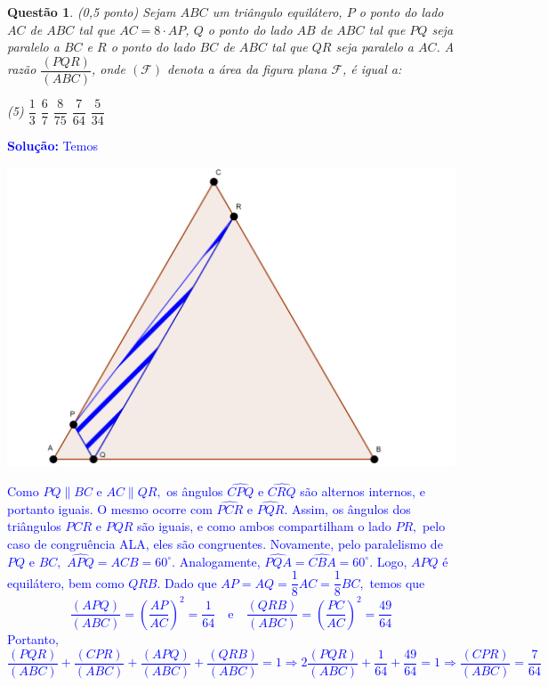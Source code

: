 \documentclass[oneside,a4paper,12pt]{article}
\newcommand{\negrito}[1]{\mbox{\boldmath{$#1$}}}
\theoremstyle{Colorido}
\theoremstyle{solu}
\theoremstyle{dotlessP}
\newtheorem{sol}{Questão}
\begin{document}
		\newpage	
	\begin{sol}
\textit{(0,5 ponto)} \newline \newline
Sejam $ABC$ um triângulo equilátero, $P$ o ponto do lado $AC$ de $ABC$ tal que $AC = 8\cdot AP$, $Q$ o ponto do lado $AB$ de $ABC$ tal que $PQ$ seja paralelo a $BC$ e $R$ o ponto do lado $BC$ de $ABC$ tal que $QR$ seja paralelo a $AC$. A razão $\dfrac{(PQR)}{(ABC)}$, onde $(\mathcal F)$ denota a área da figura plana $\mathcal F$, é igual a:
\begin{tasks}[counter-format={(tsk[a])},label-width=3.6ex, label-format = {\bfseries}, column-sep = {20pt}](5)
\task[\textcolor{blue}{$\negrito{(a)} $}] $\dfrac{1}{3}$
\task[\textcolor{blue}{$\negrito{(b)} $}] $\dfrac{6}{7}$
\task[\textcolor{blue}{$\negrito{(c)} $}] $\dfrac{8}{75}$      
\task[\textcolor{blue}{$\negrito{(d)} $}] $\dfrac{7}{64}$
\task[\textcolor{blue}{$\negrito{(e)} $}] $\dfrac{5}{34}$
\end{tasks}
\end{sol}
\textcolor{blue}{\textbf{Solução:} Temos}
\begin{center}
\includegraphics[scale=1.0]{Provas e Avaliações/Figuras avaliações/2avaliacaociclo3.png}
\end{center}
\textcolor{blue}{Como $PQ \parallel BC$ e $AC \parallel QR,$ os ângulos $\widehat{CPQ}$ e $\widehat{CRQ}$ são alternos internos, e portanto iguais. O mesmo ocorre com $\widehat{PCR}$ e $\widehat{PQR}.$ Assim, os ângulos dos triângulos $PCR$ e $PQR$ são iguais, e como ambos compartilham o lado $PR,$ pelo caso de congruência ALA, eles são congruentes. Novamente, pelo paralelismo de $PQ$ e $BC,$ $\widehat{APQ} = \widehat{ACB} = 60^\circ.$ Analogamente, $\widehat{PQA} = \widehat{CBA} = 60^\circ.$ Logo, $APQ$ é equilátero, bem como $QRB.$ Dado que $AP = AQ = \dfrac{1}{8} AC = \dfrac{1}{8} BC,$ temos que
\[\dfrac{(APQ)}{(ABC)} = \left( \dfrac{AP}{AC}  \right)^2 = \dfrac{1}{64} \quad \mbox{e} \quad \dfrac{(QRB)}{(ABC)} = \left( \dfrac{PC}{AC}  \right)^2 = \dfrac{49}{64}
\]
Portanto, 
\[\dfrac{(PQR)}{(ABC)} + \dfrac{(CPR)}{(ABC)} + \dfrac{(APQ)}{(ABC)} + \dfrac{(QRB)}{(ABC)} = 1 \Rightarrow 2\dfrac{(PQR)}{(ABC)} + \dfrac{1}{64} + \dfrac{49}{64} = 1 \Rightarrow \boxed{\dfrac{(CPR)}{(ABC)} = \dfrac{7}{64}}
\]}
\end{document}
